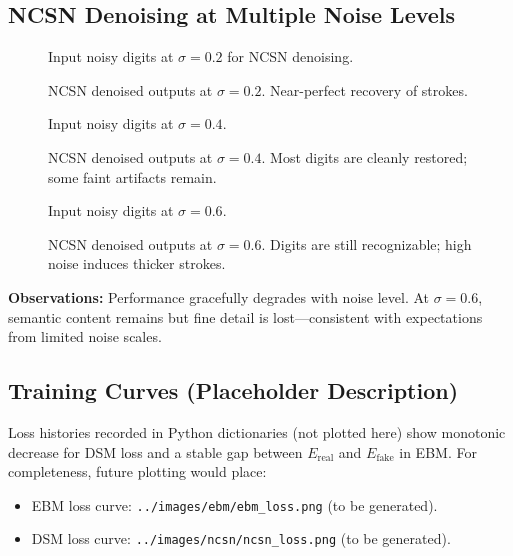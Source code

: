 \documentclass[a4paper,12pt]{article}
\begin{document}
\subsection{NCSN Denoising at Multiple Noise Levels}
\begin{figure}[H]
    \centering
    \caption{Input noisy digits at $\sigma=0.2$ for NCSN denoising.}
    \label{fig:ncsn_noisy_020}
\end{figure}
\begin{figure}[H]
    \centering
    \caption{NCSN denoised outputs at $\sigma=0.2$. Near-perfect recovery of strokes.}
    \label{fig:ncsn_denoised_020}
\end{figure}
\begin{figure}[H]
    \centering
    \caption{Input noisy digits at $\sigma=0.4$.}
    \label{fig:ncsn_noisy_040}
\end{figure}
\begin{figure}[H]
    \centering
    \caption{NCSN denoised outputs at $\sigma=0.4$. Most digits are cleanly restored; some faint artifacts remain.}
    \label{fig:ncsn_denoised_040}
\end{figure}
\begin{figure}[H]
    \centering
    \caption{Input noisy digits at $\sigma=0.6$.}
    \label{fig:ncsn_noisy_060}
\end{figure}
\begin{figure}[H]
    \centering
    \caption{NCSN denoised outputs at $\sigma=0.6$. Digits are still recognizable; high noise induces thicker strokes.}
    \label{fig:ncsn_denoised_060}
\end{figure}
\textbf{Observations:} Performance gracefully degrades with noise level. At $\sigma=0.6$, semantic content remains but fine detail is lost—consistent with expectations from limited noise scales.

\subsection{Training Curves (Placeholder Description)}
Loss histories recorded in Python dictionaries (not plotted here) show monotonic decrease for DSM loss and a stable gap between $E_{\text{real}}$ and $E_{\text{fake}}$ in EBM. For completeness, future plotting would place:
\begin{itemize}[leftmargin=*]
    \item EBM loss curve: \texttt{../images/ebm/ebm\_loss.png} (to be generated).
    \item DSM loss curve: \texttt{../images/ncsn/ncsn\_loss.png} (to be generated).
\end{itemize}
\end{document}
